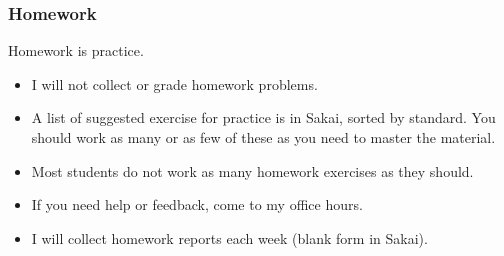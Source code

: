 \documentclass{beamer}
\begin{document}
\begin{frame}\frametitle{Homework}
Homework is practice.
\begin{itemize}
\item I will not collect or grade homework problems.
\item A list of suggested exercise for practice is in Sakai, sorted by standard.  You should work as many or as few of these as you need to master the material.
\item {} Most students do not work as many homework exercises as they should.
\item If you need help or feedback, come to my office hours.
\item I will collect homework reports each week (blank form in Sakai).
\end{itemize}
\end{frame}
\end{document}
